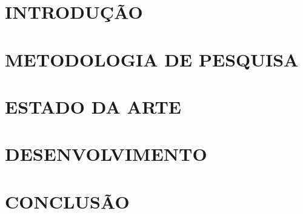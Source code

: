 \documentclass[article,12pt,oneside,a4paper,english,brazil]{unifil}
\begin{document}
\textual
\fontsize{12}{7}\selectfont
\begin{Spacing}{1.5}

\section*{INTRODUÇÃO}


\section*{METODOLOGIA DE PESQUISA}


\section*{ESTADO DA ARTE}


\section*{DESENVOLVIMENTO}



\section*{CONCLUSÃO}

\end{Spacing}
\postextual


\end{document}

